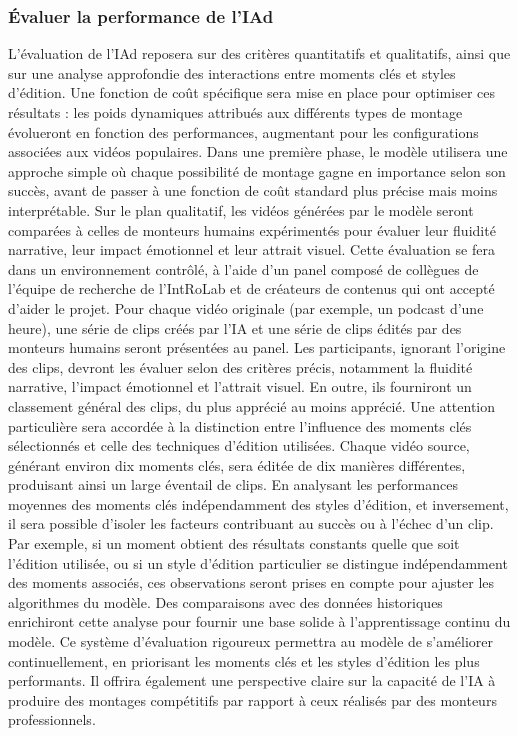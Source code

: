 \documentclass[livre]{udes-genie-these}
\begin{document}
{{\subsubsection{Évaluer la performance de l'IAd}
L'évaluation de l'IAd reposera sur des critères quantitatifs et qualitatifs, ainsi que sur une analyse approfondie des interactions entre moments clés et styles d'édition. Une fonction de coût spécifique sera mise en place pour optimiser ces résultats : les poids dynamiques attribués aux différents types de montage évolueront en fonction des performances, augmentant pour les configurations associées aux vidéos populaires. Dans une première phase, le modèle utilisera une approche simple où chaque possibilité de montage gagne en importance selon son succès, avant de passer à une fonction de coût standard plus précise mais moins interprétable.
Sur le plan qualitatif, les vidéos générées par le modèle seront comparées à celles de monteurs humains expérimentés pour évaluer leur fluidité narrative, leur impact émotionnel et leur attrait visuel. Cette évaluation se fera dans un environnement contrôlé, à l'aide d'un panel composé de collègues de l'équipe de recherche de l'IntRoLab et de créateurs de contenus qui ont accepté d'aider le projet. Pour chaque vidéo originale (par exemple, un podcast d'une heure), une série de clips créés par l'IA et une série de clips édités par des monteurs humains seront présentées au panel. Les participants, ignorant l'origine des clips, devront les évaluer selon des critères précis, notamment la fluidité narrative, l'impact émotionnel et l'attrait visuel. En outre, ils fourniront un classement général des clips, du plus apprécié au moins apprécié.
Une attention particulière sera accordée à la distinction entre l'influence des moments clés sélectionnés et celle des techniques d'édition utilisées. Chaque vidéo source, générant environ dix moments clés, sera éditée de dix manières différentes, produisant ainsi un large éventail de clips. En analysant les performances moyennes des moments clés indépendamment des styles d'édition, et inversement, il sera possible d'isoler les facteurs contribuant au succès ou à l'échec d'un clip. Par exemple, si un moment obtient des résultats constants quelle que soit l'édition utilisée, ou si un style d'édition particulier se distingue indépendamment des moments associés, ces observations seront prises en compte pour ajuster les algorithmes du modèle. Des comparaisons avec des données historiques enrichiront cette analyse pour fournir une base solide à l'apprentissage continu du modèle.
Ce système d'évaluation rigoureux permettra au modèle de s'améliorer continuellement, en priorisant les moments clés et les styles d'édition les plus performants. Il offrira également une perspective claire sur la capacité de l'IA à produire des montages compétitifs par rapport à ceux réalisés par des monteurs professionnels.

}}
\end{document}
